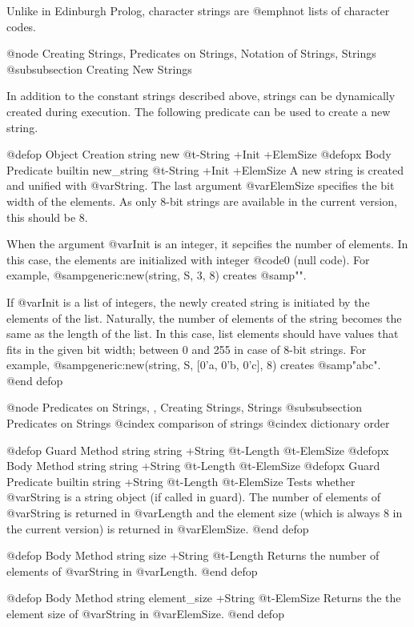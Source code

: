 {{{{Unlike in Edinburgh Prolog, character strings are @emph{not} lists of
character codes.

@node Creating Strings, Predicates on Strings, Notation of Strings, Strings
@subsubsection Creating New Strings

In addition to the constant strings described above, strings can be
dynamically created during execution.  The following predicate can be
used to create a new string.

@defop {Object Creation} string new @t{-}String +Init +ElemSize
@defopx {Body Predicate} {builtin} new_string @t{-}String +Init +ElemSize
A new string is created and unified with @var{String}.  The last
argument @var{ElemSize} specifies the bit width of the elements.  As
only 8-bit strings are available in the current version, this should be
8.

When the argument @var{Init} is an integer, it sepcifies the number of
elements.  In this case, the elements are initialized with integer
@code{0} (null code).  For example, @samp{generic:new(string, S, 3, 8)}
creates @samp{"\0\0\0"}.

If @var{Init} is a list of integers, the newly created string is
initiated by the elements of the list.  Naturally, the number of
elements of the string becomes the same as the length of the list.  In
this case, list elements should have values that fits in the given bit
width; between 0 and 255 in case of 8-bit strings.  For example,
@samp{generic:new(string, S, [0'a, 0'b, 0'c], 8)} creates @samp{"abc"}.
@end defop

@node Predicates on Strings,  , Creating Strings, Strings
@subsubsection Predicates on Strings
@cindex comparison of strings
@cindex dictionary order

@defop {Guard Method} string string +String @t{-}Length @t{-}ElemSize
@defopx {Body Method} string string +String @t{-}Length @t{-}ElemSize
@defopx {Guard Predicate} {builtin} string +String @t{-}Length @t{-}ElemSize
Tests whether @var{String} is a string object (if called in guard).  The
number of elements of @var{String} is returned in @var{Length} and the
element size (which is always 8 in the current version) is returned in
@var{ElemSize}.
@end defop

@defop {Body Method} string size +String @t{-}Length
Returns the number of elements of @var{String} in @var{Length}.
@end defop

@defop {Body Method} string element_size +String @t{-}ElemSize
Returns the the element size of @var{String} in @var{ElemSize}.
@end defop

}}}}
